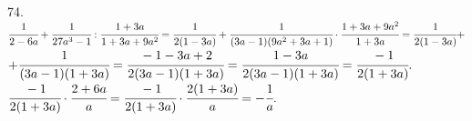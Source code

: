 74. $\cfrac{1}{2-6a}+\cfrac{1}{27a^3-1}:\cfrac{1+3a}{1+3a+9a^2}=\cfrac{1}{2(1-3a)}+\cfrac{1}{(3a-1)(9a^2+3a+1)}\cdot\cfrac{1+3a+9a^2}{1+3a}=
\cfrac{1}{2(1-3a)}+$\\$+\cfrac{1}{(3a-1)(1+3a)}=\cfrac{-1-3a+2}{2(3a-1)(1+3a)}=\cfrac{1-3a}{2(3a-1)(1+3a)}=\cfrac{-1}{2(1+3a)}.$\\
$\cfrac{-1}{2(1+3a)}\cdot\cfrac{2+6a}{a}=\cfrac{-1}{2(1+3a)}\cdot\cfrac{2(1+3a)}{a}=-\cfrac{1}{a}.$\\
